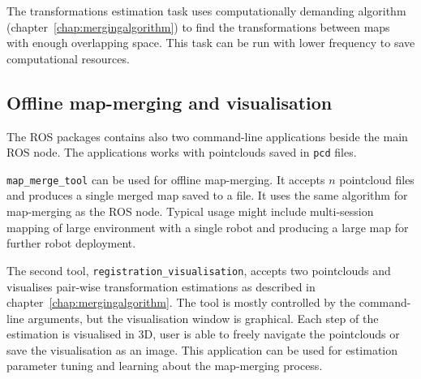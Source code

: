 The transformations estimation task uses computationally demanding algorithm (chapter~\ref{chap:mergingalgorithm}) to find the transformations between maps with enough overlapping space. This task can be run with lower frequency to save computational resources.

\subsection{Offline map-merging and visualisation}
\label{sec:commandline-tools}

The \gls{ROS} packages contains also two command-line applications beside the main \gls{ROS} node. The applications works with pointclouds saved in \texttt{pcd} files.

\texttt{map\_merge\_tool} can be used for offline map-merging. It accepts $n$ pointcloud files and produces a single merged map saved to a file. It uses the same algorithm for map-merging as the \gls{ROS} node. Typical usage might include multi-session mapping of large environment with a single robot and producing a large map for further robot deployment.

The second tool, \texttt{registration\_visualisation}, accepts two pointclouds and visualises pair-wise transformation estimations as described in chapter~\ref{chap:mergingalgorithm}. The tool is mostly controlled by the command-line arguments, but the visualisation window is graphical. Each step of the estimation is visualised in \gls{3D}, user is able to freely navigate the pointclouds or save the visualisation as an image. This application can be used for estimation parameter tuning and learning about the map-merging process.


